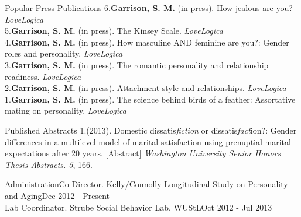 \documentclass {resume}
\newcommand{\meb}{{\bf Garrison, S. M.}\xspace}
\begin{document}
\pagestyle{myheadings}
\begin{samepage}\begin{rSection}{\textrm{Popular Press Publications}}
6.\hspace* {2.5 mm}\textbf{Garrison, S. M.} (in press). How jealous are you? \textit{LoveLogica}\smallskip\\
5.\hspace* {2.5 mm}\textbf{Garrison, S. M.} (in press). The Kinsey Scale. \textit{LoveLogica}\smallskip\\
4.\hspace* {2.5 mm}\textbf{Garrison, S. M.} (in press). How masculine AND feminine are you?: Gender roles and personality. \textit{LoveLogica}\smallskip\\
3.\hspace* {2.5 mm}\textbf{Garrison, S. M.} (in press). %
The romantic personality and relationship readiness. \textit{LoveLogica}\smallskip\\
2.\hspace* {2.5 mm}\textbf{Garrison, S. M.} (in press). Attachment style and relationships. \textit{LoveLogica}\smallskip\\
1.\hspace* {2.5 mm}\textbf{Garrison, S. M.} (in press). The science behind birds of a feather: Assortative mating on personality. \textit{LoveLogica}
\end{rSection}\end{samepage}
\begin{samepage}\begin{rSection}{\textrm{Published Abstracts}}
1.\hspace* {2.5 mm}\meb (2013). Domestic dissatis{\em fiction} or dissatis{\em fact}ion?: Gender differences in a multilevel model \hspace* {6 mm}of marital satisfaction using prenuptial marital expectations after 20 years. [Abstract] {\em Washington University \hspace* {6 mm}Senior Honors Thesis Abstracts. 5}, 166.\end{rSection}\end{samepage}
\begin{rSection}{\textrm{Administration}}Co-Director. Kelly/Connolly Longitudinal Study on Personality and Aging\hfill Dec 2012 - Present\smallskip\\
Lab Coordinator. Strube Social Behavior Lab,  WUStL\hfill Oct 2012 - Jul 2013
\end{rSection}
\end{document}
